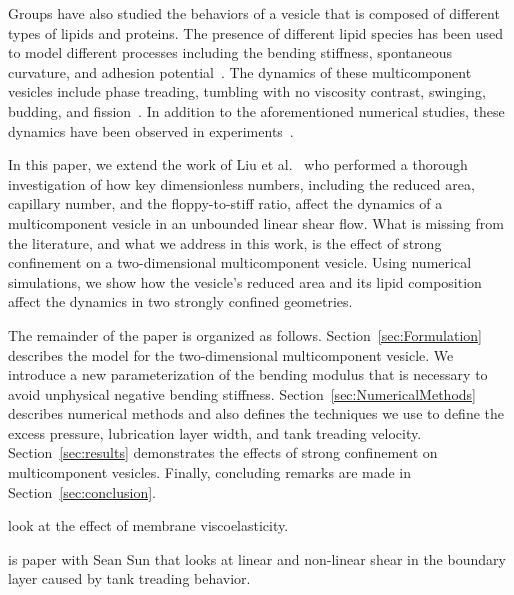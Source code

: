 \documentclass[twoside,twocolumn,9pt]{article}
\begin{document}
Groups have also studied the behaviors of a vesicle that is composed of
different types of lipids and proteins. The presence of different lipid
species has been used to model different processes including the bending
stiffness, spontaneous curvature, and adhesion
potential~\cite{zha-das-du2010, tan-yan-ima2011}. The dynamics of these
multicomponent vesicles include phase treading, tumbling with no
viscosity contrast, swinging, budding, and
fission~\cite{soh-tse-li-voi-low2010, wan-du2008, all-ama2006,
ger-sal-spa2022, lip1992, urs-klu-phi2009}. In addition to the
aforementioned numerical studies, these dynamics have been observed in
experiments~\cite{bag-sun2009, yan-ima-tan2010, yan-ima-tan2008,
dre-jah-bob-spa-gop2021}.

In this paper, we extend the work of Liu et
al.~\cite{liu-mar-li-vee-low2017} who performed a thorough investigation
of how key dimensionless numbers, including the reduced area, capillary
number, and the floppy-to-stiff ratio, affect the dynamics of a
multicomponent vesicle in an unbounded linear shear flow. What is
missing from the literature, and what we address in this work, is the
effect of strong confinement on a two-dimensional multicomponent
vesicle. Using numerical simulations, we show how the vesicle's reduced
area and its lipid composition affect the dynamics in two strongly
confined geometries.

The remainder of the paper is organized as follows.
Section~\ref{sec:Formulation} describes the model for the
two-dimensional multicomponent vesicle. We introduce a new
parameterization of the bending modulus that is necessary to avoid
unphysical negative bending stiffness.
Section~\ref{sec:NumericalMethods} describes numerical methods and also
defines the techniques we use to define the excess pressure, lubrication
layer width, and tank treading velocity. Section~\ref{sec:results}
demonstrates the effects of strong confinement on multicomponent
vesicles. Finally, concluding remarks are made in
Section~\ref{sec:conclusion}.

\citet{gur-pak-tay-siv-sac2023} look at the effect of membrane
viscoelasticity.

\citet{ram-kom-sek-ima2010}

\citet{che-lyu-jae-leo2020}

\citet{wan-ii-sug-nod-jin-liu-che-gon2023}

\citet{mis-wis-ber-key-li-tun-law-per-erd-zha-zha-sun-kal-lam-kon2019}
is paper with Sean Sun that looks at linear and non-linear shear in the
boundary layer caused by tank treading behavior.
\end{document}
